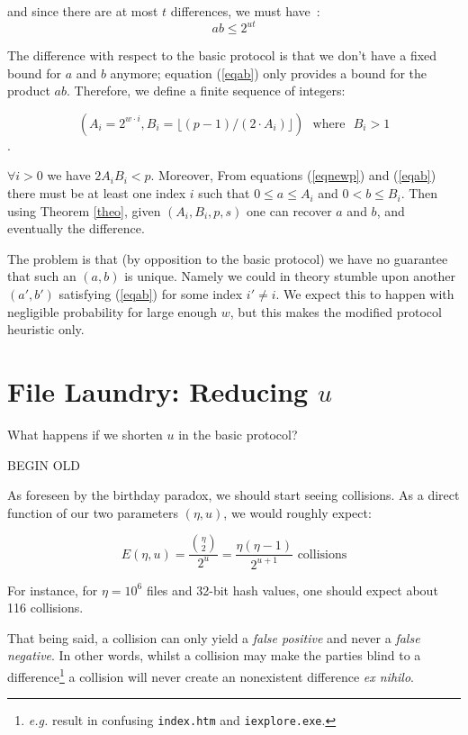 \documentclass[11pt]{llncs}
\begin{document}
and since there are at most $t$ differences, we must have~:
\begin{equation}
\label{eqab}
a b \leq 2^{ut}
\end{equation}

The difference with respect to the basic protocol is that we don't have a fixed bound for $a$ and $b$ anymore; equation (\ref{eqab}) only provides a bound for the product $a b$. Therefore, we define a finite sequence of integers:

$$(A_i=2^{w \cdot i},B_i=\lfloor (p-1)/(2 \cdot A_i) \rfloor)\mbox{~~where~~}B_i>1$$. 

$\forall i>0$ we have $2 A_i B_i<p$. Moreover, From equations (\ref{eqnewp}) and (\ref{eqab}) there must be at least one index $i$ such that $0 \leq a \leq A_i$ and $0 <b \leq B_i$. Then using Theorem \ref{theo}, given $(A_i,B_i,p,s)$ one can recover $a$ and $b$, and eventually the difference.\smallskip
 
The problem is that (by opposition to the basic protocol) we have no guarantee that such an $(a,b)$ is unique. Namely we could in theory stumble upon another $(a',b')$ satisfying (\ref{eqab}) for some index $i' \neq i$. We expect this to happen with negligible probability for large enough $w$, but this makes the modified protocol heuristic only.

\section{File Laundry: Reducing $u$}

What happens if we shorten $u$ in the basic protocol?\smallskip

{\Large BEGIN OLD}

As foreseen by the birthday paradox, we should start seeing collisions. As a direct function of our two parameters $(\eta,u)$, we would roughly expect:

$$
E(\eta,u)=\frac{\binom{\eta}{2}}{2^u} = \frac{\eta(\eta-1)}{2^{u+1}}\mbox{~collisions}
$$

For instance, for $\eta=10^6$ files and 32-bit hash values, one should expect about 116 collisions.\smallskip

That being said, a collision can only yield a {\sl false positive} and never a {\sl false negative}. In other words, whilst a collision may make the parties blind to a difference\footnote{{\sl e.g.} result in confusing {\tt index.htm} and {\tt iexplore.exe}.} a collision will never create an nonexistent difference {\sl ex nihilo}.\smallskip
\end{document}
